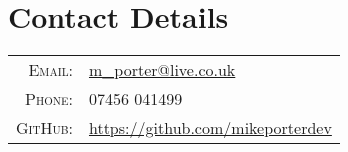 \section{Contact Details}

\begin{tabular}{rl}
    \textsc{Email:}     & \href{mailto:m_porter@live.co.uk}{m\_porter@live.co.uk} \\
    \textsc{Phone:}		& 07456 041499 \\
    \textsc{GitHub:}	& \href{https://github.com/mikeporterdev/}{https://github.com/mikeporterdev} 
\end{tabular}